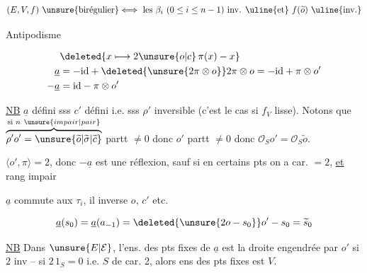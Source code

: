 \[
(E,V,f)\ \text{\unsure{birégulier}}\Longleftrightarrow
\text{ les }\beta_i\ (0\le i\le n-1)\ \text{inv. \uline{et} }f(\widetilde{o})\ \text{\uline{inv.}}
\]



Antipodisme

\[
\begin{aligned}
&\deleted{x\longmapsto 2\unsure{o|c}\,\pi(x)-x}\\
\underline a&=-\mathrm{id}+\deleted{\unsure{2\pi\otimes o}}2\pi\otimes o=-\mathrm{id}+\pi\otimes o'\\
-\underline a&=\mathrm{id}-\pi\otimes o'
\end{aligned}
\]


\uline{NB} $\underline a$ défini sss $c'$ défini i.e. sss $\rho'$ inversible (c'est le cas si $f_V$ lisse). Notons que $\overbrace{\rho' o'=\unsure{\widetilde{o}|\widetilde{\sigma}|\widetilde{c}}}^{\text{si }n\ \unsure{impair|pair}}$ partt $\ne0$ donc $o'$ partt $\ne0$ donc $\mathcal O_S o'=\mathcal O_S\widetilde{o}$.


$\langle o',\pi\rangle=2$, donc $-\underline a$ est une réflexion, sauf si en certains pts on a car. $=2$, \uline{et}   rang impair

$\underline a$ commute aux $\tau_i$, il inverse $o$, $c'$ etc.

\[
\underline a(s_0)=\underline a(a_{-1})=\deleted{\unsure{2o-s_0}}o'-s_0=\widetilde{s}_0
\]

\uline{NB} Dans $\unsure{E|\mathcal E}$, l'ens. des pts fixes de $\underline a$ est  la droite engendrée par $o'$ si $2$ inv -- si $2\,1_S=0$ i.e. $S$ de car. 2, alors  ens des pts fixes est $V$.

